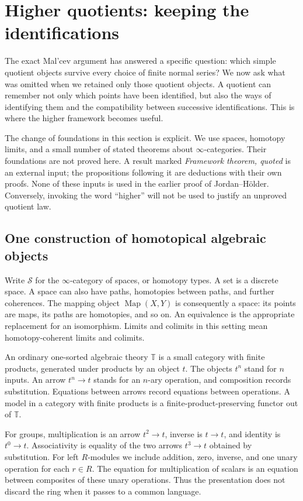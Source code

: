 \section{Higher quotients: keeping the identifications}
\label{h:chapter}

The exact Mal'cev argument has answered a specific question: which simple
quotient objects survive every choice of finite normal series?  We now ask
what was omitted when we retained only those quotient objects.  A quotient
can remember not only which points have been identified, but also the ways
of identifying them and the compatibility between successive identifications.
This is where the higher framework becomes useful.

The change of foundations in this section is explicit.  We use spaces,
homotopy limits, and a small number of stated theorems about
$\infty$-categories.  Their foundations are not proved here.  A result marked
\emph{Framework theorem, quoted} is an external input; the propositions
following it are deductions with their own proofs.  None of these inputs
is used in the earlier proof of Jordan--H\"older.  Conversely, invoking the
word ``higher'' will not be used to justify an unproved quotient law.

\subsection{One construction of homotopical algebraic objects}

Write $\mathcal S$ for the $\infty$-category of spaces, or homotopy types.
A set is a discrete space.  A space can also have paths, homotopies between
paths, and further coherences.  The mapping object
$\operatorname{Map}(X,Y)$ is consequently a space: its points are maps,
its paths are homotopies, and so on.  An equivalence is the appropriate
replacement for an isomorphism.  Limits and colimits in this setting mean
homotopy-coherent limits and colimits.

An ordinary one-sorted algebraic theory $\mathbb T$ is a small category
with finite products, generated under products by an object $t$.
The objects $t^n$ stand for $n$ inputs.  An arrow $t^n\to t$ stands for
an $n$-ary operation, and composition records substitution.  Equations
between arrows record equations between operations.  A model in a category
with finite products is a finite-product-preserving functor out of
$\mathbb T$.

For groups, multiplication is an arrow $t^2\to t$, inverse is $t\to t$,
and identity is $t^0\to t$.  Associativity is equality of the two arrows
$t^3\to t$ obtained by substitution.  For left $R$-modules we include
addition, zero, inverse, and one unary operation for each $r\in R$.
The equation for multiplication of scalars is an equation between
composites of these unary operations.  Thus the presentation does not
discard the ring when it passes to a common language.

